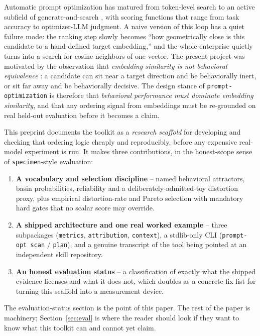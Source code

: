 Automatic prompt optimization has matured from token-level search
\citep{shin2020autoprompt} to an active subfield of generate-and-search
\citep{zhou2023ape,yang2023opro,fernando2023promptbreeder,guo2023evoprompt,pryzant2023protegi,khattab2023dspy,yuksekgonul2024textgrad},
with scoring functions that range from task accuracy to optimizer-LLM judgment.
A naive version of this loop has a quiet failure mode: the ranking step slowly
becomes ``how geometrically close is this candidate to a hand-defined target
embedding,'' and the whole enterprise quietly turns into a search for cosine
neighbors of one vector. The present project was motivated by the observation
that \emph{embedding similarity is not behavioral equivalence}
\citep{kornblith2019similarity}: a candidate can sit near a target direction and
be behaviorally inert, or sit far away and be behaviorally decisive. The design
stance of \texttt{prompt-optimization} is therefore that \emph{behavioral
performance must dominate embedding similarity}, and that any ordering signal
from embeddings must be re-grounded on real held-out evaluation before it
becomes a claim.

This preprint documents the toolkit as a \emph{research scaffold} for developing
and checking that ordering logic cheaply and reproducibly, before any expensive
real-model experiment is run. It makes three contributions, in the honest-scope
sense of \texttt{specimen}-style evaluation:

\begin{enumerate}[leftmargin=*]
  \item \textbf{A vocabulary and selection discipline} -- named behavioral
  attractors, basin probabilities, reliability and a deliberately-admitted-toy
  distortion proxy, plus empirical distortion-rate and Pareto selection with
  mandatory hard gates that no scalar score may override.
  \item \textbf{A shipped architecture and one real worked example} -- three
  subpackages (\texttt{metrics}, \texttt{attribution}, \texttt{context}), a
  stdlib-only CLI (\texttt{prompt-opt scan} / \texttt{plan}), and a genuine
  transcript of the tool being pointed at an independent skill repository.
  \item \textbf{An honest evaluation status} -- a classification of exactly what
  the shipped evidence licenses and what it does not, which doubles as a
  concrete fix list for turning this scaffold into a measurement device.
\end{enumerate}

The evaluation-status section is the point of this paper. The rest of the paper
is machinery; Section~\ref{sec:eval} is where the reader should look if they want
to know what this toolkit can and cannot yet claim.